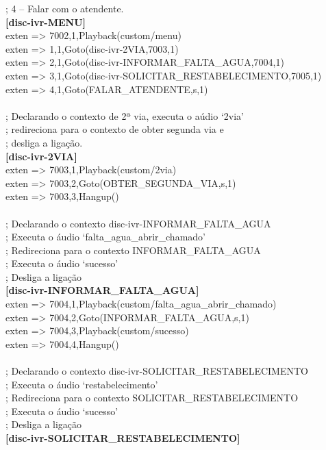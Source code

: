 \begin{apendicesenv}
; 4 – Falar com o atendente. \\
\textbf{[disc-ivr-MENU]} \\
exten => 7002,1,Playback(custom/menu) \\
exten => 1,1,Goto(disc-ivr-2VIA,7003,1) \\
exten => 2,1,Goto(disc-ivr-INFORMAR\_FALTA\_AGUA,7004,1) \\
exten => 3,1,Goto(disc-ivr-SOLICITAR\_RESTABELECIMENTO,7005,1) \\
exten => 4,1,Goto(FALAR\_ATENDENTE,s,1) \\
 \\
; Declarando o contexto de 2ª via, executa o aúdio ‘2via’ \\
; redireciona para o contexto de obter segunda via e \\
; desliga a ligação. \\
\textbf{[disc-ivr-2VIA]} \\
exten => 7003,1,Playback(custom/2via) \\
exten => 7003,2,Goto(OBTER\_SEGUNDA\_VIA,s,1) \\
exten => 7003,3,Hangup() \\
 \\
; Declarando o contexto disc-ivr-INFORMAR\_FALTA\_AGUA \\
; Executa o áudio ‘falta\_agua\_abrir\_chamado’  \\
; Redireciona para o contexto INFORMAR\_FALTA\_AGUA \\
; Executa o áudio ‘sucesso’ \\
; Desliga a ligação \\
\textbf{[disc-ivr-INFORMAR\_FALTA\_AGUA]} \\
exten => 7004,1,Playback(custom/falta\_agua\_abrir\_chamado) \\
exten => 7004,2,Goto(INFORMAR\_FALTA\_AGUA,s,1) \\
exten => 7004,3,Playback(custom/sucesso) \\
exten => 7004,4,Hangup() \\
 \\
; Declarando o contexto disc-ivr-SOLICITAR\_RESTABELECIMENTO \\
; Executa o áudio ‘restabelecimento’  \\
; Redireciona para o contexto SOLICITAR\_RESTABELECIMENTO \\
; Executa o áudio ‘sucesso’ \\
; Desliga a ligação \\
\textbf{[disc-ivr-SOLICITAR\_RESTABELECIMENTO]} \\

\end{apendicesenv}
